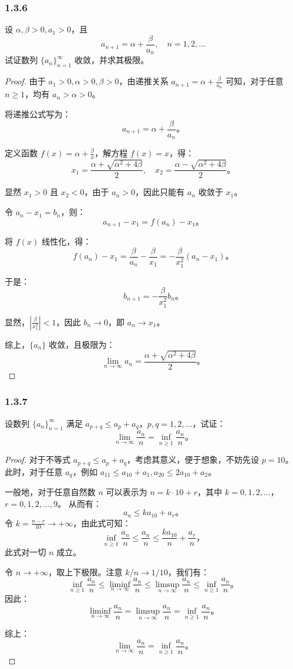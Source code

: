 \documentclass[12pt]{ctexart}
\begin{document}
\subsubsection*{1.3.6} 
设 $\alpha, \beta > 0, a_1 > 0$，且
\[
a_{n+1} = \alpha + \frac{\beta}{a_n}, \quad n = 1, 2, \ldots
\]
试证数列 $\{a_n\}_{n=1}^\infty$ 收敛，并求其极限。
\begin{proof}
由于 $a_1 > 0, \alpha > 0, \beta > 0$，由递推关系 $a_{n+1} = \alpha + \frac{\beta}{a_n}$ 可知，对于任意 $n \geq 1$，均有 $a_n > \alpha > 0$。

将递推公式写为：
\[
a_{n+1} = \alpha + \frac{\beta}{a_n}。
\]

定义函数 $f(x) = \alpha + \frac{\beta}{x}$，解方程 $f(x) = x$，得：
\[
x_1 = \frac{\alpha + \sqrt{\alpha^2 + 4\beta}}{2}, \quad x_2 = \frac{\alpha - \sqrt{\alpha^2 + 4\beta}}{2}。
\]

显然 $x_1 > 0$ 且 $x_2 < 0$，由于 $a_n > 0$，因此只能有 $a_n$ 收敛于 $x_1$。

令 $a_n - x_1 = b_n$，则：
\[
a_{n+1} - x_1 = f(a_n) - x_1。
\]

将 $f(x)$ 线性化，得：
\[
f(a_n) - x_1 = \frac{\beta}{a_n} - \frac{\beta}{x_1} = -\frac{\beta}{x_1^2}(a_n - x_1)。
\]

于是：
\[
b_{n+1} = -\frac{\beta}{x_1^2} b_n。
\]

显然，$|\frac{\beta}{x_1^2}| < 1$，因此 $b_n \to 0$，即 $a_n \to x_1$。

综上，$\{a_n\}$ 收敛，且极限为：
\[
\lim_{n \to \infty} a_n = \frac{\alpha + \sqrt{\alpha^2 + 4\beta}}{2}。
\]
\end{proof}

\subsubsection*{1.3.7} 
设数列 $\{a_n\}_{n=1}^\infty$ 满足 $a_{p+q} \leq a_p + a_q$，$p, q = 1, 2, \ldots$，试证：
\[
\lim_{n \to \infty} \frac{a_n}{n} = \inf_{n \geq 1} \frac{a_n}{n}。
\]

\begin{proof}
对于不等式 $a_{p+q} \leq a_p + a_q$，考虑其意义，便于想象，不妨先设 $p = 10$。  
此时，对于任意 $a_q$，例如 $a_{11} \leq a_{10} + a_1, a_{20} \leq 2a_{10} + a_2$。

一般地，对于任意自然数 $n$ 可以表示为 $n = k \cdot 10 + r$，其中 $k = 0, 1, 2, \ldots$，$r = 0, 1, 2, \ldots, 9$。  
从而有：
\[
a_n \leq k a_{10} + a_r。
\]
令 $k = \frac{n - r}{10} \to +\infty$，由此式可知：
\[
\inf_{n \geq 1} \frac{a_n}{n} \leq \frac{a_n}{n} \leq \frac{k a_{10}}{n} + \frac{a_r}{n}，
\]
此式对一切 $n$ 成立。

令 $n \to +\infty$，取上下极限。注意 $k/n \to 1/10$，我们有：
\[
\inf_{n \geq 1} \frac{a_n}{n} \leq \liminf_{n \to \infty} \frac{a_n}{n} \leq \limsup_{n \to \infty} \frac{a_n}{n} \leq \inf_{n \geq 1} \frac{a_n}{n}。
\]
因此：
\[
\liminf_{n \to \infty} \frac{a_n}{n} = \limsup_{n \to \infty} \frac{a_n}{n} = \inf_{n \geq 1} \frac{a_n}{n}。
\]

综上：
\[
\lim_{n \to \infty} \frac{a_n}{n} = \inf_{n \geq 1} \frac{a_n}{n}。
\]
\end{proof}
\end{document}
